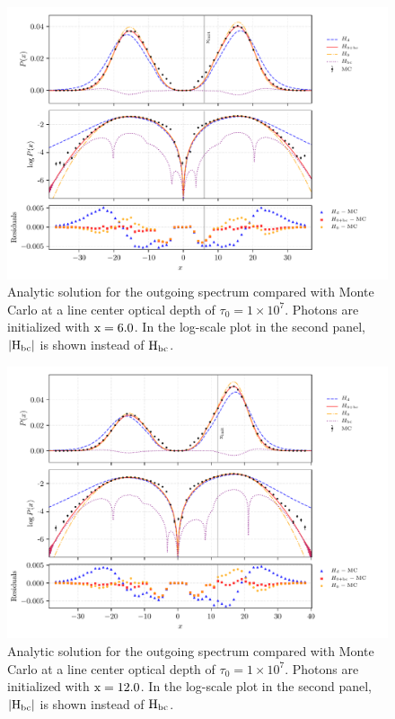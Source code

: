 \documentclass[onecolumn]{aastex63}
\begin{document}
\begin{figure}
    \centering
    \includegraphics{pdf_xinit6.0.pdf}
    \caption{Analytic solution for the outgoing spectrum compared with Monte Carlo at a line center optical depth of $\tau_0 = 1 \times 10^7$. Photons are initialized with $\rm x = 6.0$. In the log-scale plot in the second panel, $|\rm H_{bc}|$ is shown instead of $\rm H_{bc}$.} 
    \label{fig:sol_mc_residual_6}
\end{figure}

\begin{figure}
    \centering
    \includegraphics{pdf_xinit12.0.pdf}
    \caption{Analytic solution for the outgoing spectrum compared with Monte Carlo at a line center optical depth of $\tau_0 = 1 \times 10^7$. Photons are initialized with $\rm x = 12.0$. In the log-scale plot in the second panel, $|\rm H_{bc}|$ is shown instead of $\rm H_{bc}$.} 
    \label{fig:sol_mc_residual_12}
\end{figure}
\end{document}
